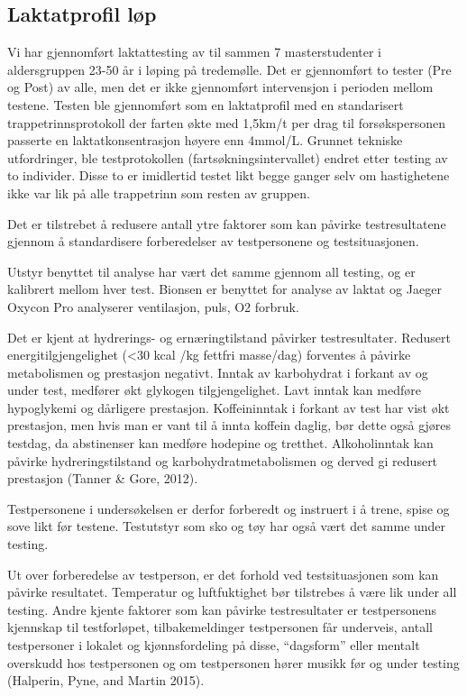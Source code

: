 \documentclass[
  letterpaper,
  DIV=11,
  numbers=noendperiod]{scrreprt}
\begin{document}
\hypertarget{laktatprofil-luxf8p}{%
\subsection{Laktatprofil løp}\label{laktatprofil-luxf8p}}

Vi har gjennomført laktattesting av til sammen 7 masterstudenter i
aldersgruppen 23-50 år i løping på tredemølle. Det er gjennomført to
tester (Pre og Post) av alle, men det er ikke gjennomført intervensjon i
perioden mellom testene. Testen ble gjennomført som en laktatprofil med
en standarisert trappetrinnsprotokoll der farten økte med 1,5km/t per
drag til forsøkspersonen passerte en laktatkonsentrasjon høyere enn
4mmol/L. Grunnet tekniske utfordringer, ble testprotokollen
(fartsøkningsintervallet) endret etter testing av to individer. Disse to
er imidlertid testet likt begge ganger selv om hastighetene ikke var lik
på alle trappetrinn som resten av gruppen.

Det er tilstrebet å redusere antall ytre faktorer som kan påvirke
testresultatene gjennom å standardisere forberedelser av testpersonene
og testsituasjonen.

Utstyr benyttet til analyse har vært det samme gjennom all testing, og
er kalibrert mellom hver test. Bionsen er benyttet for analyse av laktat
og Jaeger Oxycon Pro analyserer ventilasjon, puls, O2 forbruk.

Det er kjent at hydrerings- og ernæringtilstand påvirker testresultater.
Redusert energitilgjengelighet (\textless30 kcal /kg fettfri masse/dag)
forventes å påvirke metabolismen og prestasjon negativt. Inntak av
karbohydrat i forkant av og under test, medfører økt glykogen
tilgjengelighet. Lavt inntak kan medføre hypoglykemi og dårligere
prestasjon. Koffeininntak i forkant av test har vist økt prestasjon, men
hvis man er vant til å innta koffein daglig, bør dette også gjøres
testdag, da abstinenser kan medføre hodepine og tretthet. Alkoholinntak
kan påvirke hydreringstilstand og karbohydratmetabolismen og derved gi
redusert prestasjon (Tanner \& Gore, 2012).

Testpersonene i undersøkelsen er derfor forberedt og instruert i å
trene, spise og sove likt før testene. Testutstyr som sko og tøy har
også vært det samme under testing.

Ut over forberedelse av testperson, er det forhold ved testsituasjonen
som kan påvirke resultatet. Temperatur og luftfuktighet bør tilstrebes å
være lik under all testing. Andre kjente faktorer som kan påvirke
testresultater er testpersonens kjennskap til testforløpet,
tilbakemeldinger testpersonen får underveis, antall testpersoner i
lokalet og kjønnsfordeling på disse, ``dagsform'' eller mentalt
overskudd hos testpersonen og om testpersonen hører musikk før og under
testing (Halperin, Pyne, and Martin 2015).
\end{document}
